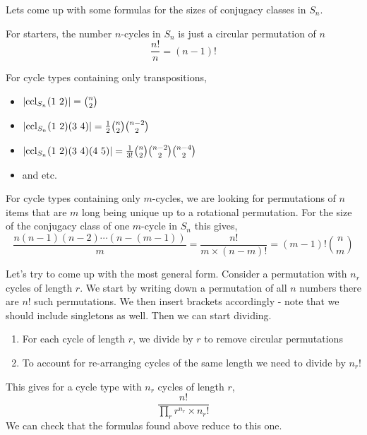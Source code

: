 \documentclass{article}
\begin{document}
\begin{remark}
    Lets come up with some formulas for the sizes of conjugacy classes in $S_n$.

    For starters, the number $n$-cycles in $S_n$ is just a circular permutation of $n$
    \[
        \frac{n!}{n} = (n-1)!  
    \]

    For cycle types containing only transpositions,
    \begin{itemize}
        \item $\left\lvert \operatorname{ccl}_{S_n}(1\ 2)\right\rvert = \binom{n}{2}$
        \item $\left\lvert \operatorname{ccl}_{S_n}(1\ 2)(3\ 4)\right\rvert = \frac{1}{2}\binom{n}{2}\binom{n-2}{2}$
        \item $\left\lvert \operatorname{ccl}_{S_n}(1\ 2)(3\ 4)(4\ 5)\right\rvert = \frac{1}{3!}\binom{n}{2}\binom{n-2}{2}\binom{n-4}{2}$
        \item and etc.
    \end{itemize}

    For cycle types containing only $m$-cycles, we are looking for permutations of $n$ items that are $m$ long being unique up to a rotational permutation.
    For the size of the conjugacy class of one $m$-cycle in $S_n$ this gives, 
    \[
        \frac{n (n-1) (n-2) \cdots (n - (m-1))}{m} = \frac{n!}{m \times (n - m)!} = (m-1)!\binom{n}{m}  
    \]

    Let's try to come up with the most general form. Consider a permutation with $n_r$ cycles of length $r$.
    We start by writing down a permutation of all $n$ numbers there are $n!$ such permutations. 
    We then insert brackets accordingly - note that we should include singletons as well. Then we can start dividing.
    \begin{enumerate}
        \item For each cycle of length $r$, we divide by $r$ to remove circular permutations
        \item To account for re-arranging cycles of the same length we need to divide by $n_r !$
    \end{enumerate}
    This gives for a cycle type with $n_r$ cycles of length $r$,
    \[
        \frac{n!}{\prod_r{r^{n_r} \times n_r!}}  
    \]
    We can check that the formulas found above reduce to this one.
\end{remark}
\end{document}
